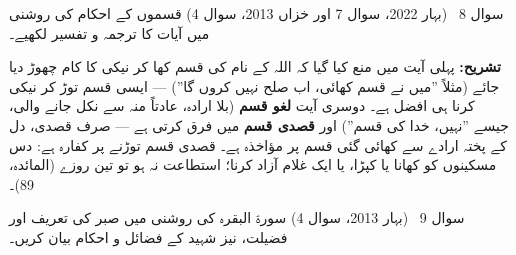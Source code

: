 \begin{sawal}{سوال \textenglish{8} \ \textnormal{\small(بہار \textenglish{2022}، سوال \textenglish{7} اور خزاں \textenglish{2013}، سوال \textenglish{4})}}
قسموں کے احکام کی روشنی میں آیات کا ترجمہ و تفسیر لکھیے۔
\end{sawal}

\begin{hal}

\smallskip
{}

\medskip
\textbf{تشریح:} پہلی آیت میں منع کیا گیا کہ اللہ کے نام کی قسم کھا کر نیکی کا
کام چھوڑ دیا جائے (مثلاً ''میں نے قسم کھائی، اب صلح نہیں کروں گا'') --- ایسی
قسم توڑ کر نیکی کرنا ہی افضل ہے۔ دوسری آیت \textbf{لغو قسم} (بلا ارادہ، عادتاً
منہ سے نکل جانے والی، جیسے ''نہیں، خدا کی قسم'') اور \textbf{قصدی قسم} میں
فرق کرتی ہے --- صرف قصدی، دل کے پختہ ارادے سے کھائی گئی قسم پر مؤاخذہ ہے۔
قصدی قسم توڑنے پر کفارہ ہے: دس مسکینوں کو کھانا یا کپڑا، یا ایک غلام آزاد
کرنا؛ استطاعت نہ ہو تو تین روزے (المائدہ، \textenglish{89})۔
\end{hal}

\begin{sawal}{سوال \textenglish{9} \ \textnormal{\small(بہار \textenglish{2013}، سوال \textenglish{4})}}
سورۃ البقرہ کی روشنی میں صبر کی تعریف اور فضیلت، نیز شہید کے فضائل و احکام
بیان کریں۔
\end{sawal}

